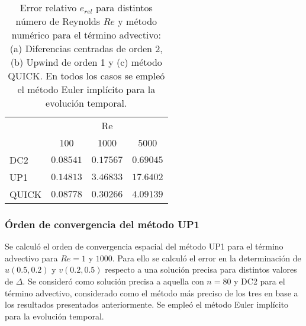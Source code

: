\documentclass[aps,prb,twocolumn,superscriptaddress,floatfix,longbibliography,10pt]{revtex4-2}
\newcounter{para}
\begin{document}



\begin{table}[]
  \begin{tabular}{l|lll|}
  \cline{2-4}
            & \multicolumn{3}{c|}{Re}                                     \\ \cline{2-4} 

            & \multicolumn{1}{c|}{100} & \multicolumn{1}{c|}{1000} &  \multicolumn{1}{c|}{5000} \\ \hline
  \multicolumn{1}{|l|}{DC2} & \multicolumn{1}{c|}{$0.08541$} & \multicolumn{1}{c|}{$0.17567$} & $0.69045$ \\ \hline
  \multicolumn{1}{|l|}{UP1} & \multicolumn{1}{c|}{$0.14813$} & \multicolumn{1}{c|}{$3.46833$} & $17.6402$ \\ \hline
  \multicolumn{1}{|l|}{QUICK} & \multicolumn{1}{c|}{$0.08778$} & \multicolumn{1}{c|}{$0.30266$} & $4.09139$ \\ \hline
  \end{tabular}
  \caption{Error relativo $e_{rel}$ para distintos número de Reynolds $Re$ y método numérico para el término advectivo: (a) Diferencias centradas de orden 2, (b) Upwind de orden 1 y (c) método QUICK. En todos los casos se empleó el método Euler implícito para la evolución temporal.}
  \label{tabla:erel}
\end{table}

\subsubsection{Órden de convergencia del método UP1}

Se calculó el orden de convergencia espacial del método UP1 para el término advectivo para $Re = 1$ y $1000$. Para ello se calculó el error en la determinación de $u(0.5, 0.2)$ y $v(0.2, 0.5)$ respecto a una solución precisa para distintos valores de $\Delta$. Se consideró como solución precisa a aquella con $n = 80$ y DC2 para el término advectivo, considerado como el método más preciso de los tres en base a los resultados presentados anteriormente. Se empleó el método Euler implícito para la evolución temporal.
\end{document}
